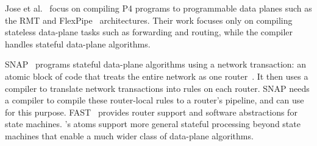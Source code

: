 Jose et al.~\cite{lavanya_compiler} focus on compiling P4 programs to
programmable data planes such as the RMT and FlexPipe~\cite{flexpipe} architectures. Their work
focuses only on compiling stateless data-plane tasks such as forwarding and
routing, while the \pktlanguage compiler handles stateful data-plane
algorithms.

SNAP~\cite{snap} programs stateful data-plane algorithms using a network
transaction: an atomic block of code that treats the entire network as one
router~\cite{onebigswitch}. It then uses a compiler to translate network
transactions into rules on each router. SNAP needs a compiler to compile these
router-local rules to a router's pipeline, and can use \pktlanguage for this
purpose. FAST~\cite{fast} provides router support and software abstractions for
state machines. \absmachine's atoms support more general stateful processing
beyond state machines that enable a much wider class of data-plane algorithms.



